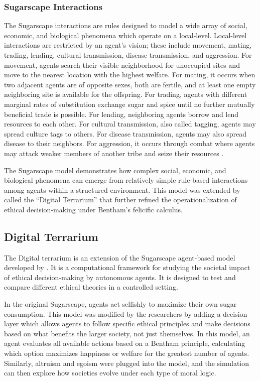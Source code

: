\documentclass{icsthesis}
\begin{document}
\begin{mainmatter}
				\subsubsection{Sugarscape Interactions}
The Sugarscape interactions are rules designed to model a wide array of social, economic, and biological phenomena which operate on a local-level. Local-level interactions are restricted by an agent’s vision; these include movement, mating, trading, lending, cultural transmission, disease transmission, and aggression. For movement, agents search their visible neighborhood for unoccupied sites and move to the nearest location with the highest welfare. For mating, it occurs when two adjacent agents are of opposite sexes, both are fertile, and at least one empty neighboring site is available for the offspring. For trading, agents with different marginal rates of substitution exchange sugar and spice until no further mutually beneficial trade is possible. For lending, neighboring agents borrow and lend resources to each other. For cultural transmission, also called tagging, agents may spread culture tags to others. For disease transmission, agents may also spread disease to their neighbors. For aggression, it occurs through combat where agents may attack weaker members of another tribe and seize their resources \citep{Kehoe2015}.

The Sugarscape model demonstrates how complex social, economic, and biological phenomena can emerge from relatively simple rule-based interactions among agents within a structured environment. This model was extended by \citet{KremerHerman2024b} called the “Digital Terrarium” that further refined the operationalization of ethical decision-making under Bentham’s felicific calculus.

			\subsection{Digital Terrarium}
The Digital terrarium is an extension of the Sugarscape agent-based model developed by \citet{KremerHerman2024b}. It is a computational framework for studying the societal impact of ethical decision-making by autonomous agents. It is designed to test and compare different ethical theories in a controlled setting. 

In the original Sugarscape, agents act selfishly to maximize their own sugar consumption. This model was modified by the researchers by adding a decision layer which allows agents to follow specific ethical principles and make decisions based on what benefits the larger society, not just themselves. In this model, an agent evaluates all available actions based on a Bentham principle, calculating which option maximizes happiness or welfare for the greatest number of agents. Similarly, altruism and egoism were plugged into the model, and the simulation can then explore how societies evolve under each type of moral logic.


\end{mainmatter}
\end{document}
